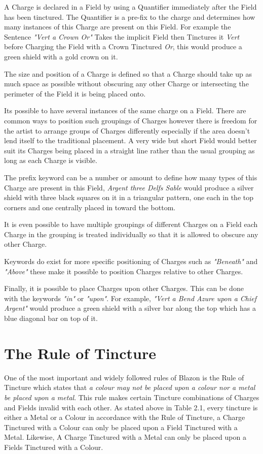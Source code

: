 A Charge is declared in a Field by using a Quantifier immediately after the Field has been tinctured.  The Quantifier is a pre-fix to the charge and determines how many instances of this Charge are present on this Field.  For example the Sentence \emph{"Vert a Crown Or"} Takes the implicit Field then Tinctures it \emph{Vert} before Charging the Field with a Crown Tinctured \emph{Or}, this would produce a green shield with a gold crown on it. 

The size and position of a Charge is defined so that a Charge should take up as much space as possible without obscuring any other Charge or intersecting the perimeter of the Field it is being placed onto.  

Its possible to have several instances of the same charge on a Field. There are common ways to position such groupings of Charges however there is freedom for the artist to arrange groups of Charges differently especially if the area doesn't lend itself to the traditional placement.  A very wide but short Field would better suit its Charges being placed in a straight line rather than the usual grouping as long as each Charge is visible. 


The prefix keyword can be a number or amount to define how many types of this Charge are present in this Field, \emph{Argent three Delfs Sable} would produce a silver shield with three black squares on it in a triangular pattern, one each in the  top corners and one centrally placed in toward the bottom. 

It is even possible to have multiple groupings of different Charges on a Field each Charge in the grouping is treated individually so that it is allowed to obscure any other Charge.  

Keywords do exist for more specific positioning of Charges such as \emph{"Beneath"} and \emph{"Above"} these make it possible to position Charges relative to other Charges.

Finally, it is possible to place Charges upon other Charges.  This can be done with the keywords \emph{"in"} or \emph{"upon"}. For example, \emph{"Vert a Bend Azure upon a Chief Argent"} would produce a green shield with a silver bar along the top which has a blue diagonal bar on top of it.



\section{The Rule of Tincture}
One of the most important and widely followed rules of Blazon is the Rule of Tincture which states that \emph{a colour may not be placed upon a colour nor a metal be placed upon a metal}\cite[p.46]{ruleofTincture}.  This rule makes certain Tincture combinations of Charges and Fields invalid with each other.  As stated above in Table 2.1, every tincture is either a Metal or a Colour in accordance with the Rule of Tincture, a Charge Tinctured with a Colour can only be placed upon a Field Tinctured with a Metal.  Likewise, A Charge Tinctured with a Metal can only be placed upon a Fields Tinctured with a Colour.  

